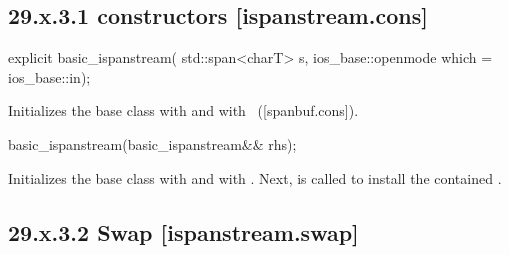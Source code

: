 \documentclass[ebook,11pt,article]{memoir}
\renewcommand{\iref}[1]{[#1]}
\begin{document}

\subsection{29.x.3.1  constructors [ispanstream.cons]}
\label{ispanstream.cons}

\begin{itemdecl}
explicit basic_ispanstream(
  std::span<charT> s,
  ios_base::openmode which = ios_base::in);
\end{itemdecl}

\begin{itemdescr}
\pnum
\effects
Initializes the base class with
and  with
~(\iref{spanbuf.cons}).
\end{itemdescr}

\begin{itemdecl}
basic_ispanstream(basic_ispanstream&& rhs);
\end{itemdecl}

\begin{itemdescr}
\pnum
\effects 
Initializes the base class with  
and  with .
Next,  is called to
install the contained .
\end{itemdescr}

\subsection{29.x.3.2 Swap [ispanstream.swap]}
\label{ispanstream.assign}
\end{document}
